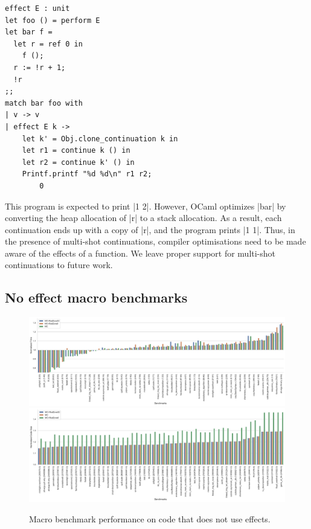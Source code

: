 \documentclass[sigplan,10pt,review,anonymous]{acmart}\settopmatter{printfolios=true,printccs=false,printacmref=false}
\begin{document}
\begin{minipage}{\linewidth}
\begin{lstlisting}
effect E : unit
let foo () = perform E
let bar f =
  let r = ref 0 in
	f ();
  r := !r + 1;
  !r
;;
match bar foo with
| v -> v
| effect E k ->
    let k' = Obj.clone_continuation k in
    let r1 = continue k () in
    let r2 = continue k' () in
    Printf.printf "%d %d\n" r1 r2;
		0
\end{lstlisting}
\end{minipage}

This program is expected to print |1 2|. However, OCaml optimizes |bar| by
converting the heap allocation of |r| to a stack allocation. As a result, each
continuation ends up with a copy of |r|, and the program prints |1 1|. Thus, in
the presence of multi-shot continuations, compiler optimisations need to be
made aware of the effects of a function. We leave proper support for multi-shot
continuations to future work.

\subsection*{No effect macro benchmarks}

\begin{figure}
	\begin{minipage}{\linewidth}
	\includegraphics[width=\linewidth]{sandmark-notebook/sandmark_time}
	\includegraphics[width=\linewidth]{sandmark-notebook/sandmark_codesize}
	\end{minipage}
	\caption{Macro benchmark performance on code that does not use effects.}
	\label{res:macro}
\end{figure}
\end{document}
